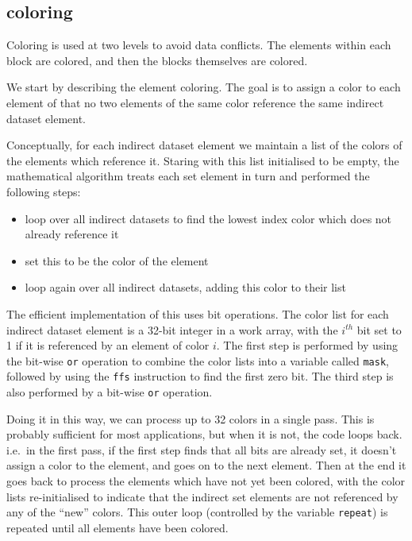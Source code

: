 \documentclass[12pt]{article}
\begin{document}
\newpage

\subsection{coloring}

Coloring is used at two levels to avoid data conflicts.  The 
elements within each block are colored, and then the blocks 
themselves are colored.

We start by describing the element coloring. The goal is 
to assign a color to each element of that no two elements
of the same color reference the same indirect dataset element.

Conceptually, for each indirect dataset element we maintain
a list of the colors of the elements which reference it. 
Staring with this list initialised to be empty, the mathematical
algorithm treats each set element in turn and performed the 
following steps:
\begin{itemize}
\item 
loop over all indirect datasets to find the lowest index 
color which does not already reference it
\item
set this to be the color of the element
\item
loop again over all indirect datasets, adding this color
to their list
\end{itemize}

The efficient implementation of this uses bit operations.
The color list for each indirect dataset element is a 
32-bit integer in a work array, with the $i^{th}$ bit set 
to 1 if it is referenced by an element of color $i$.
The first step is performed by using the bit-wise {\tt or}
operation to combine the color lists into a variable called
{\tt mask}, followed by using the {\tt ffs} instruction to 
find the first zero bit.  The third step is also performed 
by a bit-wise {\tt or} operation.

Doing it in this way, we can process up to 32 colors in a 
single pass.  This is probably sufficient for most applications, 
but when it is not, the code loops back. i.e.~in the first pass,
if the first step finds that all bits are already set, it doesn't 
assign a color to the element, and goes on to the next element.
Then at the end it goes back to process the elements which have 
not yet been colored, with the color lists re-initialised to
indicate that the indirect set elements are not referenced by 
any of the ``new'' colors.  This outer loop (controlled by the 
variable {\tt repeat}) is repeated until all elements have been 
colored.
\end{document}
